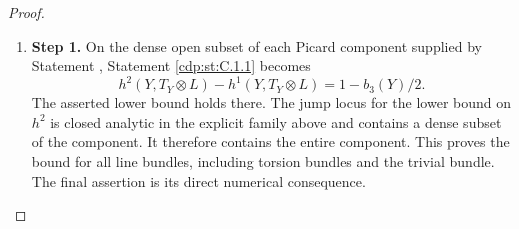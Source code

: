 \begin{proof}
\begin{enumerate}[label={$\langle1\rangle$\arabic*.},leftmargin=*]
\item 
\noindent\textbf{Step 1.} On the dense open subset of each Picard component supplied by
Statement , Statement \ref{cdp:st:C.1.1} becomes
\[
 h^2(Y,T_Y\otimes L)-h^1(Y,T_Y\otimes L)
 =1-b_3(Y)/2.
\]
The asserted lower bound holds there. The jump locus for the lower
bound on $h^2$ is closed analytic in the explicit family above and
contains a dense subset of the component. It therefore contains the
entire component. This proves the bound for all line bundles,
including torsion bundles and the trivial bundle. The final assertion
is its direct numerical consequence.

\end{enumerate}
\end{proof}
